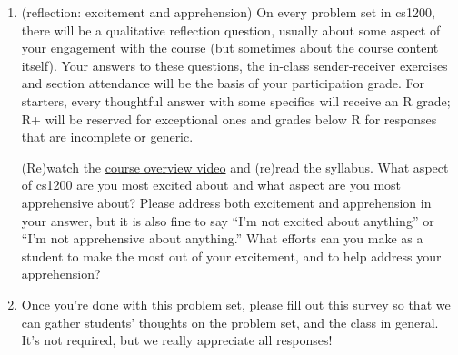 \documentclass[11pt]{article}
\begin{document}
\begin{enumerate}
\begin{enumerate}
\begin{enumerate}
        \item $f(n) = \left| \{S \subseteq [n] : |S|\leq 4\}\right|,$ where $[n]=\{0,1,2,\ldots,n-1\}$, and $g(n)=3n^3$.


        \item $f(n) = n!$, $g(n)=2^{n^2}$.

    \item Prove or disprove: For all functions $f,g : \N\rightarrow \R^+,$ $f=O(g) \Rightarrow \big(g= o(f)$ OR $f=o(g)\big)$.
    \end{enumerate}

\item (reflection: excitement and apprehension) On every problem set in cs1200, there will be a qualitative reflection question, usually about some aspect of your engagement with the course (but sometimes about the course content itself). Your answers to these questions, the in-class sender-receiver exercises and section attendance will be the basis of your participation grade.  For starters, every thoughtful answer with some specifics will receive an R grade; R+ will be reserved for exceptional ones and grades below R for responses that are incomplete or generic.

(Re)watch the \href{https://harvard.hosted.panopto.com/Panopto/Pages/Viewer.aspx?id=cd2ec5c8-5f47-45a8-927a-b149008cd981}{course overview video} and (re)read the syllabus.  What aspect of cs1200 are you most excited about and what aspect are you most apprehensive about? Please address both excitement and apprehension in your answer, but it is also fine to say “I’m not excited about anything” or “I’m not apprehensive about anything.” What efforts can you make as a student to make the most out of your excitement, and to help address your apprehension?

\item Once you're done with this problem set, please fill out \href{https://forms.gle/ecBn7mAgZatgNwnF9}{this survey} so that we can gather students' thoughts on the problem set, and the class in general. It's not required, but we really appreciate all responses!
\end{enumerate}
\end{enumerate}
\end{document}
